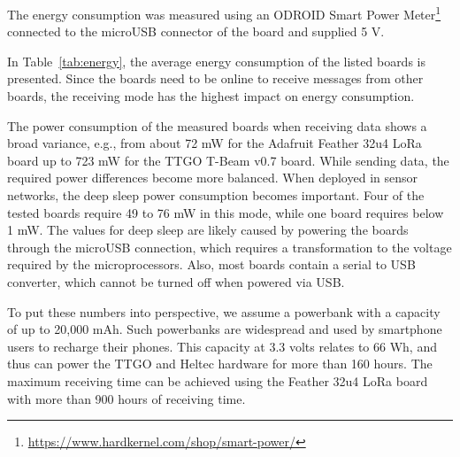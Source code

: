 The energy consumption was measured using an ODROID Smart Power Meter\footnote{\url{https://www.hardkernel.com/shop/smart-power/}} connected to the microUSB connector of the board and supplied 5 V.

In Table~\ref{tab:energy}, the average energy consumption of the listed boards is presented. 
Since the boards need to be online to receive messages from other boards, the receiving mode has the highest impact on energy consumption.

The power consumption of the measured boards when receiving data shows a broad variance, e.g., from about 72 mW for the Adafruit Feather 32u4 LoRa board up to 723 mW for the TTGO T-Beam v0.7 board.
While sending data, the required power differences become more balanced.
When deployed in sensor networks, the deep sleep power consumption becomes important. 
Four of the tested boards require 49 to 76 mW in this mode, while one board requires below 1 mW.
The values for deep sleep are likely caused by powering the boards through the microUSB connection, which requires a transformation to the voltage required by the microprocessors. 
Also, most boards contain a serial to USB converter, which cannot be turned off when powered via USB.

To put these numbers into perspective, we assume a powerbank with a capacity of up to 20,000 mAh. Such powerbanks are widespread and used by smartphone users to recharge their phones. 
This capacity at 3.3 volts relates to 66 Wh, and thus can power the TTGO and Heltec hardware for more than 160 hours. 
The maximum receiving time can be achieved using the Feather 32u4 LoRa board with more than 900 hours of receiving time.
